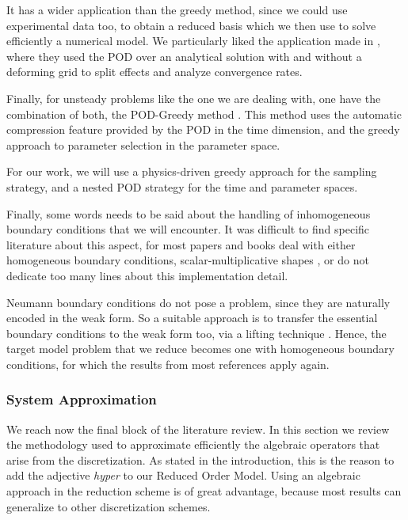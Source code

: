 \documentclass[thesis.tex]{subfiles}
\begin{document}
It has a wider application than the greedy method,
since we could use experimental data too, 
to obtain a reduced basis which we then use to solve efficiently a numerical model.
We particularly liked the application made in
\cite{2003_podBasedReducedOrderModelsWithDeformingGrids_anttonen},
where they used the POD over an analytical solution 
with and without a deforming grid to split effects and analyze convergence rates.

Finally, for unsteady problems like the one we are dealing with,
one have the combination of both, the \mbox{POD-Greedy} method
\cite{Haasdonk2008, 
Haasdonk2013}.
This method uses the automatic compression feature provided by the POD in the time dimension,
and the greedy approach to parameter selection in the parameter space.

For our work, we will use a physics-driven greedy approach for the sampling strategy,
and a nested POD strategy for the time and parameter spaces.

Finally, some words needs to be said about the handling of inhomogeneous boundary conditions
that we will encounter.
It was difficult to find specific literature about this aspect,
for most papers and books deal with either homogeneous boundary conditions, 
scalar-multiplicative shapes 
\cite{separableBoundaryCondition,
separableBoundaryCondition_Two},
or do not dedicate too many lines about this implementation detail.

Neumann boundary conditions do not pose a problem, 
since they are naturally encoded in the weak form.
So a suitable approach is to transfer the essential boundary conditions to the weak form too,
via a lifting technique
\cite{2007_ReducedOrderModelingTimeDependentPDEsMultipleParametersBoundaryData_gunzburger}.
Hence, the target model problem that we reduce 
becomes one with homogeneous boundary conditions,
for which the results from most references apply again.

\subsubsection{System Approximation}
We reach now the final block of the literature review.
In this section we review the methodology used to approximate efficiently 
the algebraic operators that arise from the discretization.
As stated in the introduction, this is the reason to add the adjective \textit{hyper} 
to our Reduced Order Model.
Using an algebraic approach in the reduction scheme is of great advantage,
because most results can generalize to other discretization schemes.
\end{document}
